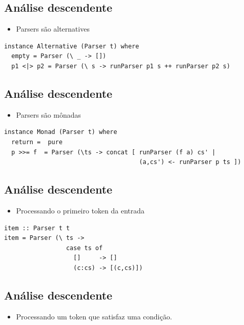 \documentclass[11pt]{article}
\begin{document}
\subsection*{Análise descendente}
\label{sec:org051c926}

\begin{itemize}
\item Parsers são alternatives
\end{itemize}

\begin{verbatim}
instance Alternative (Parser t) where
  empty = Parser (\ _ -> [])
  p1 <|> p2 = Parser (\ s -> runParser p1 s ++ runParser p2 s)
\end{verbatim}
\subsection*{Análise descendente}
\label{sec:org96a7130}

\begin{itemize}
\item Parsers são mônadas
\end{itemize}

\begin{verbatim}
instance Monad (Parser t) where
  return =  pure
  p >>= f  = Parser (\ts -> concat [ runParser (f a) cs' |
                                     (a,cs') <- runParser p ts ])
\end{verbatim}
\subsection*{Análise descendente}
\label{sec:orgd386655}

\begin{itemize}
\item Processando o primeiro token da entrada
\end{itemize}

\begin{verbatim}
item :: Parser t t
item = Parser (\ ts ->
                 case ts of
                   []     -> []
                   (c:cs) -> [(c,cs)])
\end{verbatim}
\subsection*{Análise descendente}
\label{sec:org69734de}

\begin{itemize}
\item Processando um token que satisfaz uma condição.
\end{itemize}
\end{document}
